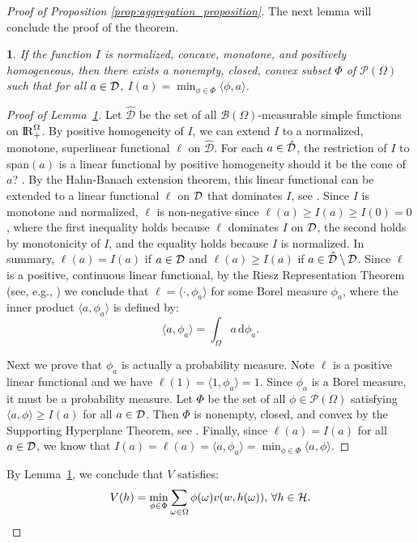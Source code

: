 \documentclass[11pt,oneside]{article}
\theoremstyle{plain}
\theoremstyle{plain}
\theoremstyle{plain}
\theoremstyle{plain}
\theoremstyle{plain}
\theoremstyle{definition}
\theoremstyle{definition}
\theoremstyle{remark}
\theoremstyle{plain}
\newtheorem{lem}[thm]{\protect\lemmaname}
\providecommand{\lemmaname}{Lemma}
\newcommand{\R}{{\rm I\!R}}
\newcommand{\wh}[1]{{\color{blue} #1     }}
\newcommand{\dee}{\mathrm{d}}
\begin{document}
\begin{proof}[Proof of Proposition \ref{prop:aggregation_proposition}]
The next lemma will conclude the proof of the theorem.
\begin{lem}
    \label{lem:MEU_DROP_lem2}
    If the function $I$ is normalized, concave, monotone, and positively homogeneous, then there exists a nonempty, closed, convex subset $\Phi$ of $\mathcal{P}(\Omega)$ such that for all $a\in {\cal D}$, $I(a) = \min_{\phi \in \Phi}\langle \phi,a \rangle$.
\end{lem}
\begin{proof}[Proof of Lemma~\ref{lem:MEU_DROP_lem2}]
    Let $\hat{\mathcal{D}}$ be the set of all $\mathcal{B}(\Omega)$-measurable simple functions on $\R_+^{\Omega}$.
    By positive homogeneity of $I$, we can extend $I$ to a normalized, monotone, superlinear functional $\ell$ on $\hat{\mathcal{D}}$.
    For each $a \in \hat{{\cal D}}$, the restriction of $I$ to span$(a)$ is a linear functional by positive homogeneity \wh{should it be the cone of $a$?}.
    By the Hahn-Banach extension theorem, this linear functional can be extended to a linear functional $\ell$ on ${\cal D}$ that dominates $I$, 
    see \cite[Theorem 5.53]{ali2006}. Since $I$ is monotone and normalized, $\ell$ is non-negative since $\ell(a) \geq I(a) \geq I(0) =0$, where the first inequality holds because $\ell$ dominates $I$ on ${\cal D}$, the second holds by monotonicity of $I$, and the equality holds because $I$ is normalized.
    In summary, $\ell(a) = I(a)$ if $a\in {\cal D}$ and $\ell(a) \geq I(a)$ if $a \in \hat{{\cal D}}\setminus {\cal D}$.
    Since $\ell$ is a positive, continuous linear functional, by the Riesz Representation Theorem (see, e.g., \cite[Theorem 14.5]{ali2006})
    we conclude that
    $\ell=\langle \cdot,\phi_a \rangle$ for some Borel measure $\phi_a$, where the inner product $\langle a, \phi_a \rangle$ is defined by:
    $$
    \langle a, \phi_a \rangle = \int_{\Omega} a  \, \dee \phi_a.
    $$

    Next we prove that $\phi_a$ is actually a probability measure. Note $\ell$ is a positive linear functional and we have $\ell(1) = \langle 1, \phi_a \rangle = 1$. Since $\phi_a$ is a Borel measure, it must be a probability measure.
    Let $\Phi$ be the set of all $\phi \in \mathcal{P}(\Omega)$ satisfying
    $\langle a,\phi \rangle \geq I(a)$ for all $a \in {\cal D}$. Then $\Phi$ is nonempty, closed, and convex by the Supporting Hyperplane Theorem, see \cite[Theorem 7.19]{ali2006}. 
    Finally, since $\ell(a) = I(a)$ for all $a\in {\cal D}$, we know that $I(a) = \ell(a) = \langle a, \phi_a \rangle = \min_{\phi \in \Phi} \langle a,\phi \rangle$.
\end{proof}

By Lemma~\ref{lem:MEU_DROP_lem2}, we conclude that $V$ satisfies:
\[
    V(h) = \min_{\phi \in \Phi} \sum_{\omega \in \Omega}\phi(\omega)v(w,h(\omega)),\, \forall h\in {\cal H}.
\]

\end{proof}    
\end{document}
